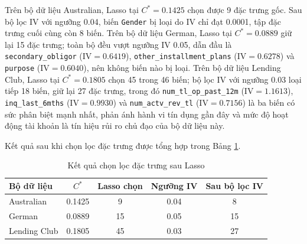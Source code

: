 Trên bộ dữ liệu Australian, Lasso tại $C^* = 0.1425$ chọn được 9 đặc trưng gốc. Sau bộ lọc IV với ngưỡng 0.04, biến \texttt{Gender} bị loại do IV chỉ đạt 0.0001, tập đặc trưng cuối cùng còn 8 biến. Trên bộ dữ liệu German, Lasso tại $C^* = 0.0889$ giữ lại 15 đặc trưng; toàn bộ đều vượt ngưỡng IV 0.05, dẫn đầu là \texttt{secondary\_obligor} ($\text{IV} = 0.6419$), \texttt{other\_installment\_plans} ($\text{IV} = 0.6278$) và \texttt{purpose} ($\text{IV} = 0.6040$), nên không biến nào bị loại. Trên bộ dữ liệu Lending Club, Lasso tại $C^* = 0.1805$ chọn 45 trong 46 biến; bộ lọc IV với ngưỡng 0.03 loại tiếp 18 biến, giữ lại 27 đặc trưng, trong đó \texttt{num\_tl\_op\_past\_12m} ($\text{IV} = 1.1613$), \texttt{inq\_last\_6mths} ($\text{IV} = 0.9930$) và \texttt{num\_actv\_rev\_tl} ($\text{IV} = 0.7156$) là ba biến có sức phân biệt mạnh nhất, phản ánh hành vi tín dụng gần đây và mức độ hoạt động tài khoản là tín hiệu rủi ro chủ đạo của bộ dữ liệu này.

\vspace{1em}
Kết quả sau khi chọn lọc đặc trưng được tổng hợp trong Bảng \ref{tab:lasso_results}.

\begin{table}[htbp]
    \centering
    \caption{Kết quả chọn lọc đặc trưng sau Lasso}
    \label{tab:lasso_results}
    \renewcommand{\arraystretch}{1.3} %
    \begin{tabular}{|l|c|c|c|c|}
        \hline
        \textbf{Bộ dữ liệu} & \textbf{$C^*$} & \textbf{Lasso chọn} & \textbf{Ngưỡng IV} & \textbf{Sau bộ lọc IV} \\ \hline
        Australian & 0.1425 & 9 & 0.04 & 8 \\ \hline
        German & 0.0889 & 15 & 0.05 & 15 \\ \hline
        Lending Club & 0.1805 & 45 & 0.03 & 27 \\ \hline
    \end{tabular}
\end{table}


